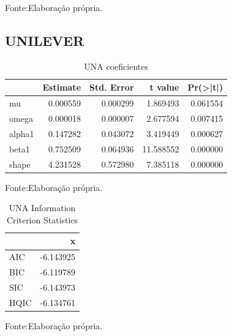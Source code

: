 \documentclass[
  12pt,
  a4paper,
  openany]{book}
\begin{document}
Fonte:Elaboração própria.

\justifying
\bigskip

\hypertarget{unilever}{%
\subsection{UNILEVER}\label{unilever}}

\begin{table}[!h]

\caption{\label{tab:unnamed-chunk-16}UNA coeficientes}
\centering
\begin{tabular}[t]{lrrrr}
\toprule
  &  Estimate &  Std. Error &  t value & Pr(>|t|)\\
\midrule
mu & 0.000559 & 0.000299 & 1.869493 & 0.061554\\
omega & 0.000018 & 0.000007 & 2.677594 & 0.007415\\
alpha1 & 0.147282 & 0.043072 & 3.419449 & 0.000627\\
beta1 & 0.752509 & 0.064936 & 11.588552 & 0.000000\\
shape & 4.231528 & 0.572980 & 7.385118 & 0.000000\\
\bottomrule
\end{tabular}
\end{table}
\FloatBarrier
\centering

Fonte:Elaboração própria.

\justifying
\bigskip

\begin{table}[!h]

\caption{\label{tab:unnamed-chunk-17}UNA Information Criterion Statistics}
\centering
\begin{tabular}[t]{lr}
\toprule
  & x\\
\midrule
AIC & -6.143925\\
BIC & -6.119789\\
SIC & -6.143973\\
HQIC & -6.134761\\
\bottomrule
\end{tabular}
\end{table}
\FloatBarrier
\centering

Fonte:Elaboração própria.

\justifying
\bigskip
\end{document}
